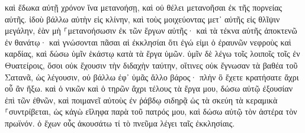 \documentclass[twoside, 9pt]{extreport}
\begin{document}
καὶ ἔδωκα αὐτῇ χρόνον ἵνα μετανοήσῃ, καὶ οὐ θέλει μετανοῆσαι ἐκ τῆς πορνείας αὐτῆς. 
ἰδοὺ βάλλω αὐτὴν εἰς κλίνην, καὶ τοὺς μοιχεύοντας μετ᾽ αὐτῆς εἰς θλῖψιν μεγάλην, ἐὰν μὴ ⸀μετανοήσωσιν ἐκ τῶν ἔργων αὐτῆς· 
καὶ τὰ τέκνα αὐτῆς ἀποκτενῶ ἐν θανάτῳ· καὶ γνώσονται πᾶσαι αἱ ἐκκλησίαι ὅτι ἐγώ εἰμι ὁ ἐραυνῶν νεφροὺς καὶ καρδίας, καὶ δώσω ὑμῖν ἑκάστῳ κατὰ τὰ ἔργα ὑμῶν. 
ὑμῖν δὲ λέγω τοῖς λοιποῖς τοῖς ἐν Θυατείροις, ὅσοι οὐκ ἔχουσιν τὴν διδαχὴν ταύτην, οἵτινες οὐκ ἔγνωσαν τὰ βαθέα τοῦ Σατανᾶ, ὡς λέγουσιν, οὐ βάλλω ἐφ᾽ ὑμᾶς ἄλλο βάρος· 
πλὴν ὃ ἔχετε κρατήσατε ἄχρι οὗ ἂν ἥξω. 
καὶ ὁ νικῶν καὶ ὁ τηρῶν ἄχρι τέλους τὰ ἔργα μου, δώσω αὐτῷ ἐξουσίαν ἐπὶ τῶν ἐθνῶν, 
καὶ ποιμανεῖ αὐτοὺς ἐν ῥάβδῳ σιδηρᾷ ὡς τὰ σκεύη τὰ κεραμικὰ ⸀συντρίβεται, 
ὡς κἀγὼ εἴληφα παρὰ τοῦ πατρός μου, καὶ δώσω αὐτῷ τὸν ἀστέρα τὸν πρωϊνόν. 
ὁ ἔχων οὖς ἀκουσάτω τί τὸ πνεῦμα λέγει ταῖς ἐκκλησίαις. 
\end{document}
